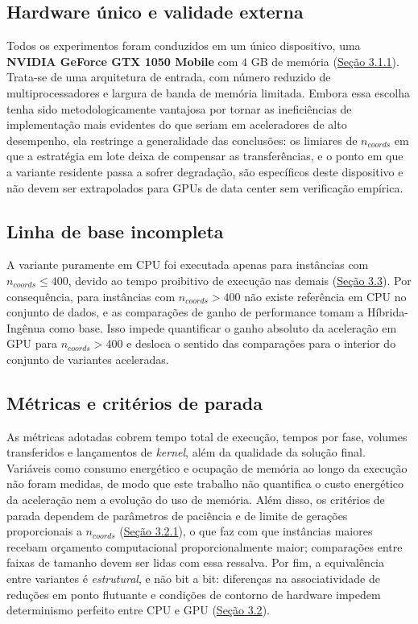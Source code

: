 \subsection{Hardware único e validade externa}\label{sec-533-hardware-unico}

Todos os experimentos foram conduzidos em um único dispositivo, uma \textbf{NVIDIA GeForce GTX 1050 Mobile} com \(4\) GB de memória (\hyperref[sec-311-hardware-software]{Seção 3.1.1}).
Trata-se de uma arquitetura de entrada, com número reduzido de multiprocessadores e largura de banda de memória limitada.
Embora essa escolha tenha sido metodologicamente vantajosa por tornar as ineficiências de implementação mais evidentes do que seriam em aceleradores de alto desempenho, ela restringe a generalidade das conclusões: os limiares de \(n_{coords}\) em que a estratégia em lote deixa de compensar as transferências, e o ponto em que a variante residente passa a sofrer degradação, são específicos deste dispositivo e não devem ser extrapolados para GPUs de data center sem verificação empírica.

\subsection{Linha de base incompleta}\label{sec-534-baseline-incompleta}

A variante puramente em CPU foi executada apenas para instâncias com \(n_{coords} \le 400\), devido ao tempo proibitivo de execução nas demais (\hyperref[sec-33-selecao-instancias]{Seção 3.3}).
Por consequência, para instâncias com \(n_{coords} > 400\) não existe referência em CPU no conjunto de dados, e as comparações de ganho de performance tomam a Híbrida-Ingênua como base. Isso impede quantificar o ganho absoluto da aceleração em GPU para \(n_{coords} > 400\) e desloca o sentido das comparações para o interior do conjunto de variantes aceleradas.

\subsection{Métricas e critérios de parada}\label{sec-535-metricas-criterios}

As métricas adotadas cobrem tempo total de execução, tempos por fase, volumes transferidos e lançamentos de \emph{kernel}, além da qualidade da solução final.
Variáveis como consumo energético e ocupação de memória ao longo da execução não foram medidas, de modo que este trabalho não quantifica o custo energético da aceleração nem a evolução do uso de memória. Além disso, os critérios de parada dependem de parâmetros de paciência e de limite de gerações proporcionais a \(n_{coords}\) (\hyperref[sec-321-ga-base]{Seção 3.2.1}), o que faz com que instâncias maiores recebam orçamento computacional proporcionalmente maior; comparações entre faixas de tamanho devem ser lidas com essa ressalva.
Por fim, a equivalência entre variantes é \emph{estrutural}, e não bit a bit: diferenças na associatividade de reduções em ponto flutuante e condições de contorno de hardware impedem determinismo perfeito entre CPU e GPU (\hyperref[sec-32-arquitetura-variantes]{Seção 3.2}).

